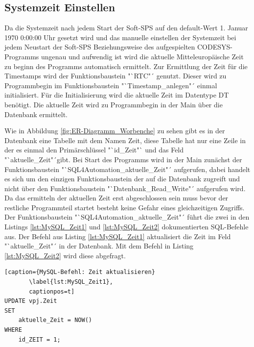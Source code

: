 \subsection{Systemzeit Einstellen}
Da die Systemzeit nach jedem Start der Soft-SPS auf den default-Wert 1. Januar 1970 0:00:00 Uhr gesetzt wird und das manuelle einstellen der Systemzeit bei jedem Neustart der Soft-SPS Beziehungsweise des aufgespielten CODESYS-Programms ungenau und aufwendig ist wird die aktuelle Mitteleuropäische Zeit zu beginn des Programms automatisch ermittelt. Zur Ermittlung der Zeit für die Timestamps wird der Funktionsbaustein "`RTC"´ genutzt. Dieser wird zu Programmbegin im Funktionsbaustein "`Timestamp\_anlegen"´ einmal initialisiert. Für die Initialisierung wird die aktuelle Zeit im Datentype DT benötigt. Die aktuelle Zeit wird zu Programmbegin in der Main über die Datenbank ermittelt. 

Wie in Abbildung \ref{fig:ER-Diagramm_Worbenche} zu sehen gibt es in der Datenbank eine Tabelle mit dem Namen Zeit, diese Tabelle hat nur eine Zeile in der es einmal den Primärschlüssel "`id\_Zeit"` und das Feld "`aktuelle\_Zeit"´gibt. Bei Start des Programms wird in der Main zunächst der Funktionsbaustein "`SQL4Automation\_aktuelle\_Zeit"´ aufgerufen, dabei handelt es sich um den einzigen Funktionsbaustein der auf die Datenbank zugreift und nicht über den Funktionsbaustein "`Datenbank\_Read\_Write"´ aufgerufen wird. Da das ermitteln der aktuellen Zeit erst abgeschlossen sein muss bevor der restliche Programmteil startet besteht keine Gefahr eines gleichzeitigen Zugriffs.
Der Funktionsbaustein "`SQL4Automation\_aktuelle\_Zeit"´ führt die zwei in den Listings \ref{lst:MySQL_Zeit1} und \ref{lst:MySQL_Zeit2} dokumentierten SQL-Befehle aus.
Der Befehl aus Listing \ref{lst:MySQL_Zeit1} aktualisiert die Zeit im Feld "`aktuelle\_Zeit"´ in der Datenbank. Mit dem Befehl in Listing \ref{lst:MySQL_Zeit2} wird diese abgefragt.

\begin{lstlisting}[caption={MySQL-Befehl: Zeit aktualisieren}
       \label{lst:MySQL_Zeit1},
       captionpos=t] 
UPDATE vpj.Zeit
SET
    aktuelle_Zeit = NOW()
WHERE
    id_ZEIT = 1;
\end{lstlisting}

